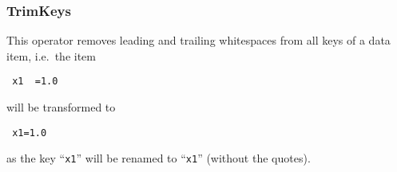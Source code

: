 \subsubsection{TrimKeys}

This operator removes leading and trailing whitespaces from all keys of
a data item, i.e.~the item

\begin{verbatim}
 x1  =1.0
\end{verbatim}
will be transformed to

\begin{verbatim}
 x1=1.0
\end{verbatim}
as the key ``\texttt{x1}'' will be renamed to ``\texttt{x1}'' (without
the quotes).


